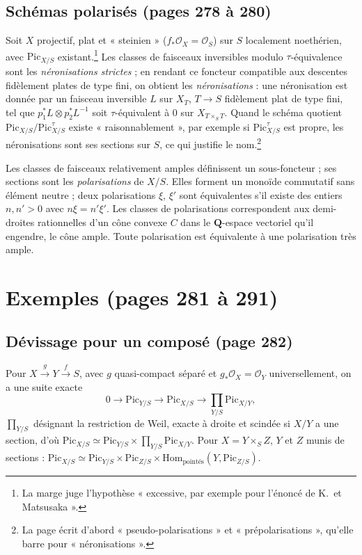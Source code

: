 \documentclass[11pt,a4paper]{article}
\begin{document}
\subsection*{Schémas polarisés (pages 278 à 280)}

Soit $X$ projectif, plat et « steinien » ($f_*\mathcal{O}_X = \mathcal{O}_S$)
sur $S$ localement noethérien, avec $\mathrm{Pic}_{X/S}$
existant.\footnote{La marge juge l'hypothèse « excessive, par exemple pour
l'énoncé de K.\ et Matsusaka ».} Les classes de faisceaux inversibles modulo
$\tau$-équivalence sont les \emph{néronisations strictes} ; en rendant ce
foncteur compatible aux descentes fidèlement plates de type fini, on obtient
les \emph{néronisations} : une néronisation est donnée par un faisceau
inversible $L$ sur $X_T$, $T \to S$ fidèlement plat de type fini, tel que
$p_1^*L \otimes p_2^*L^{-1}$ soit $\tau$-équivalent à $0$ sur
$X_{T \times_S T}$. Quand le schéma quotient
$\mathrm{Pic}_{X/S}/\mathrm{Pic}^\tau_{X/S}$ existe « raisonnablement »,
par exemple si $\mathrm{Pic}^\tau_{X/S}$ est propre, les néronisations sont ses
sections sur $S$, ce qui justifie le nom.\footnote{La page écrit d'abord
« pseudo-polarisations » et « prépolarisations », qu'elle barre pour
« néronisations ».}

Les classes de faisceaux relativement amples définissent un sous-foncteur ; ses
sections sont les \emph{polarisations} de $X/S$. Elles forment un monoïde
commutatif sans élément neutre ; deux polarisations $\xi$, $\xi'$ sont
équivalentes s'il existe des entiers $n, n' > 0$ avec $n\xi = n'\xi'$. Les
classes de polarisations correspondent aux demi-droites rationnelles d'un cône
convexe $C$ dans le $\mathbf{Q}$-espace vectoriel qu'il engendre, le cône
ample. Toute polarisation est équivalente à une polarisation très ample.

\section*{Exemples (pages 281 à 291)}

\subsection*{Dévissage pour un composé (page 282)}

Pour $X \xrightarrow{g} Y \xrightarrow{f} S$, avec $g$ quasi-compact séparé et
$g_*\mathcal{O}_X = \mathcal{O}_Y$ universellement, on a une suite exacte
\[
0 \to \mathrm{Pic}_{Y/S} \to \mathrm{Pic}_{X/S} \to \textstyle\prod_{Y/S}\mathrm{Pic}_{X/Y} ,
\]
$\prod_{Y/S}$ désignant la restriction de Weil, exacte à droite et scindée si
$X/Y$ a une section, d'où
$\mathrm{Pic}_{X/S} \simeq \mathrm{Pic}_{Y/S} \times \prod_{Y/S}\mathrm{Pic}_{X/Y}$.
Pour $X = Y \times_S Z$, $Y$ et $Z$ munis de sections :
$\mathrm{Pic}_{X/S} \simeq \mathrm{Pic}_{Y/S} \times \mathrm{Pic}_{Z/S} \times \mathrm{Hom}_{\text{pointés}}(Y, \mathrm{Pic}_{Z/S})$.
\end{document}
